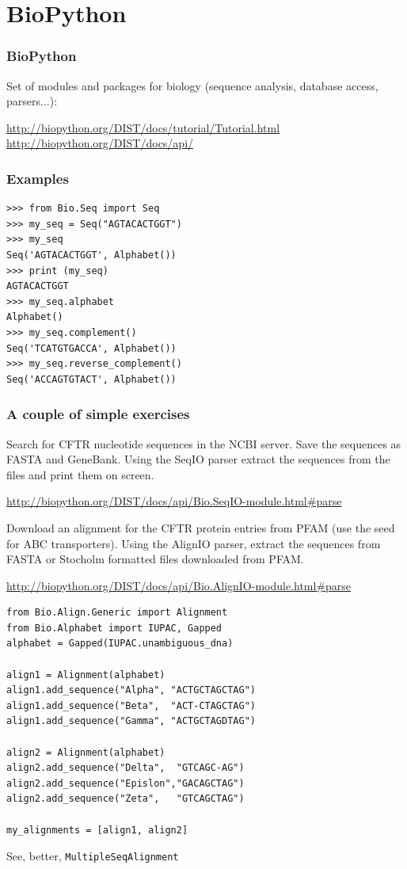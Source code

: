 \documentclass{beamer}
\begin{document}
\section{BioPython}

\begin{frame}
\frametitle{BioPython}
Set of modules and packages for biology (sequence analysis, database access, parsers...):

\url{http://biopython.org/DIST/docs/tutorial/Tutorial.html}
\url{http://biopython.org/DIST/docs/api/}

\end{frame}

\begin{frame}[containsverbatim]
\frametitle{Examples}
\begin{lstlisting}
>>> from Bio.Seq import Seq
>>> my_seq = Seq("AGTACACTGGT")
>>> my_seq
Seq('AGTACACTGGT', Alphabet())
>>> print (my_seq)
AGTACACTGGT
>>> my_seq.alphabet
Alphabet()
>>> my_seq.complement()
Seq('TCATGTGACCA', Alphabet())
>>> my_seq.reverse_complement()
Seq('ACCAGTGTACT', Alphabet())
\end{lstlisting}
\end{frame}

\begin{frame}[containsverbatim]
\frametitle{A couple of simple exercises}
\begin{example}
Search for CFTR nucleotide sequences in the NCBI server. Save the sequences as FASTA and GeneBank. Using the SeqIO parser extract the sequences from the files and print them on screen. 
\end{example}
\small\url{http://biopython.org/DIST/docs/api/Bio.SeqIO-module.html#parse}\normalsize
\begin{example}
Download an alignment for the CFTR protein entries from PFAM (use the seed for ABC transporters). Using the AlignIO parser, extract the sequences from FASTA or Stocholm formatted files downloaded from PFAM.
\end{example}
\small\url{http://biopython.org/DIST/docs/api/Bio.AlignIO-module.html#parse}\normalsize
\end{frame}

\begin{frame}[containsverbatim]
\begin{lstlisting}
from Bio.Align.Generic import Alignment
from Bio.Alphabet import IUPAC, Gapped
alphabet = Gapped(IUPAC.unambiguous_dna)

align1 = Alignment(alphabet)
align1.add_sequence("Alpha", "ACTGCTAGCTAG")
align1.add_sequence("Beta",  "ACT-CTAGCTAG")
align1.add_sequence("Gamma", "ACTGCTAGDTAG")

align2 = Alignment(alphabet)
align2.add_sequence("Delta",  "GTCAGC-AG")
align2.add_sequence("Epislon","GACAGCTAG")
align2.add_sequence("Zeta",   "GTCAGCTAG")

my_alignments = [align1, align2]
\end{lstlisting}
See, better, \texttt{MultipleSeqAlignment}
\end{frame}
\end{document}
